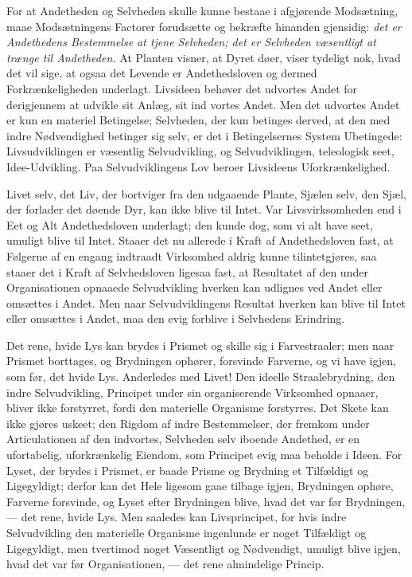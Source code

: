 \documentclass[11pt]{book}
\newcommand{\opage}[1]{\marginnote{\footnotesize\textit{[#1]}}}
\begin{document}
For at Andetheden og Selvheden skulle kunne bestaae i afgjørende
Modsætning, maae Modsætningens Factorer forudsætte og bekræfte hinanden
gjensidig: \emph{det er Andethedens Bestemmelse at tjene Selvheden; det er
Selvheden væsentligt at trænge til Andetheden.} At Planten visner, at Dyret
døer, viser tydeligt nok, hvad det vil sige, at ogsaa det Levende er
Andethedsloven og dermed Forkrænkeligheden underlagt. Livsideen behøver det
udvortes Andet for derigjennem at udvikle sit Anlæg, sit ind\-%
\opage{281} \setcounter{footnote}{0}%
vortes Andet. Men det udvortes Andet er kun en materiel Betingelse;
Selvheden, der kun betinges derved, at den med indre Nødvendighed betinger
sig selv, er det i Betingelsernes System Ubetingede: Livsudviklingen er
væsentlig Selvudvikling, og Selvudviklingen, teleologisk seet,
Idee-Udvikling. Paa Selvudviklingens Lov beroer Livsideens
Uforkrænkelighed.

Livet selv, det Liv, der bortviger fra den udgaaende Plante, Sjælen selv,
den Sjæl, der forlader det døende Dyr, kan ikke blive til Intet. Var
Livsvirksomheden end i Eet og Alt Andethedsloven underlagt; den kunde dog,
som vi alt have seet, umuligt blive til Intet. Staaer det nu allerede i
Kraft af Andethedsloven fast, at Følgerne af en engang indtraadt Virksomhed
aldrig kunne tilintetgjøres, saa staaer det i Kraft af Selvhedsloven
ligesaa fast, at Resultatet af den under Organisationen opnaaede
Selvudvikling hverken kan udlignes ved Andet eller omsættes i Andet. Men
naar Selvudviklingens Resultat hverken kan blive til Intet eller omsættes i
Andet, maa den evig forblive i Selvhedens Erindring.

Det rene, hvide Lys kan brydes i Prismet og skille sig i Farvestraaler; men
naar Prismet borttages, og Brydningen ophører, forsvinde Farverne, og vi
have igjen, som før, det hvide Lys. Anderledes med Livet! Den ideelle
Straalebrydning, den indre Selvudvikling, Principet under sin organiserende
Virksomhed opnaaer, bliver ikke forstyrret, fordi den materielle Organisme
forstyrres. Det Skete kan ikke gjøres uskeet; den Rigdom af indre
Bestemmelser, der fremkom under Articulationen af den indvortes, Selvheden
selv iboende Andethed, er en ufortabelig, uforkrænkelig Eiendom, som
Principet evig maa beholde i Ideen. For Lyset, der brydes i Prismet, er
baade Prisme og Brydning et Tilfældigt og Ligegyldigt; derfor kan det Hele
ligesom gaae tilbage igjen, Brydningen ophøre, Farverne forsvinde, og Lyset
efter Brydningen blive,
\opage{282} \setcounter{footnote}{0}%
hvad det var før Brydningen, --- det rene, hvide Lys. Men saaledes kan
Livsprincipet, for hvis indre Selvudvikling den materielle Organisme
ingenlunde er noget Tilfældigt og Ligegyldigt, men tvertimod noget
Væsentligt og Nødvendigt, umuligt blive igjen, hvad det var før
Organisationen, --- det rene almindelige Princip.
\end{document}
